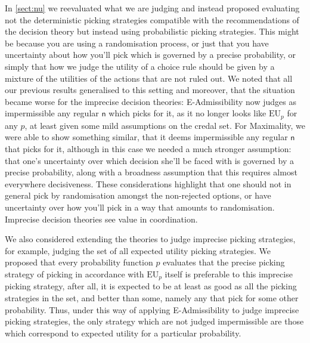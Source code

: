 \documentclass[a4paper]{article}
\newcommand\EU{\mathrm{EU}}
\newcommand{\n}{\mathsf{n}}
\newcommand{\todoold}[2][]{\todo[backgroundcolor=white,bordercolor=orange!10,linecolor=gray!10, #1,caption={},textcolor=gray]{Pre-rev: #2}}
\newcommand{\todooldinfo}[2][]{\todoold[#1]{#2}}
\newenvironment{CCM rewritten}
{\begingroup\color{blue}} %
{\endgroup}              %
\begin{document}
In \cref{sect:nu} we reevaluated what we are judging and instead proposed evaluating not the deterministic picking strategies compatible with the recommendations of the decision theory but instead using probabilistic picking strategies. This might be because you are using a randomisation process, or just that you have uncertainty about how you'll pick which is governed by a precise probability, or simply that how we judge the utility of a choice rule should be given by a mixture of the utilities of the actions that are not ruled out. 
We noted that all our previous results generalised to this setting and moreover, that the situation became worse for the imprecise decision theories:
 E-Admissibility now judges as impermissible any regular $\n$ which picks for it, as it no longer looks like $\EU_p$ for any $p$, at least given some mild assumptions on the credal set. 
For Maximality, we were able to show something similar, that it deems impermissible any regular $\n$ that picks for it, although in this case we needed a much stronger assumption: that one's uncertainty over which decision she'll be faced with is governed by a precise probability, along with a broadness assumption that this requires almost everywhere decisiveness. 
	These considerations highlight that one should not in general pick by randomisation amongst the non-rejected options, or have uncertainty over how you'll pick in a way that amounts to randomisation. Imprecise decision theories see value in coordination. %



	We also considered extending the theories to judge imprecise picking strategies, for example, judging the set of all expected utility picking strategies. We proposed that every probability function $p$ evaluates that the precise picking strategy of picking in accordance with $\EU_{p}$ itself is preferable to this imprecise picking strategy, after all, it is expected to be at least as good as all the picking strategies in the set, and better than some, namely any that pick for some other probability. Thus, under this way of applying E-Admissibility to judge imprecise picking strategies, the only strategy which are not judged impermissible are those which correspond to expected utility for a particular probability. \todooldinfo{ARGH!}
\end{document}
